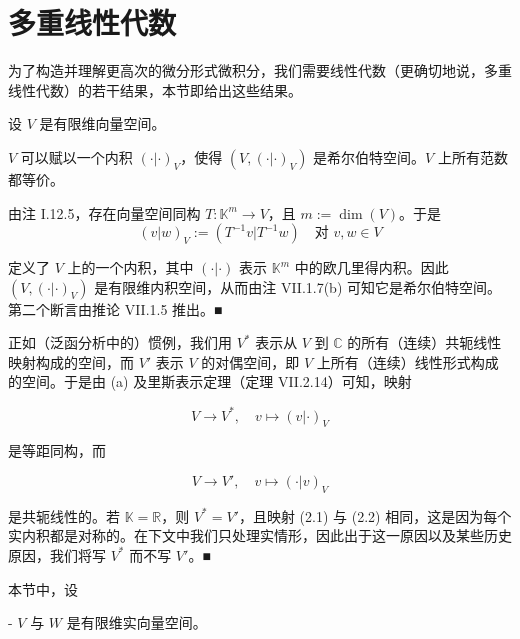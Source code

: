 \section{多重线性代数}

为了构造并理解更高次的微分形式微积分，我们需要线性代数（更确切地说，多重线性代数）的若干结果，本节即给出这些结果。

\begin{remark}

设 $ V $ 是有限维向量空间。

\begin{items}
\item

$ V $ 可以赋以一个内积 $ (\cdot|\cdot)_{V} $，使得 $ (V,(\cdot|\cdot)_{V}) $ 是希尔伯特空间。$ V $ 上所有范数都等价。

\proofhead
由注 I.12.5，存在向量空间同构 $ T:\mathbb{K}^{m} \to V $，且 $ m := \dim(V) $。于是
\[
(v|w)_{V} := (T^{-1}v|T^{-1}w) \quad \text{对 } v,w \in V
\]

定义了 $ V $ 上的一个内积，其中 $ (\cdot|\cdot) $ 表示 $ \mathbb{K}^{m} $ 中的欧几里得内积。因此 $ (V,(\cdot|\cdot)_{V}) $ 是有限维内积空间，从而由注 VII.1.7(b) 可知它是希尔伯特空间。第二个断言由推论 VII.1.5 推出。\nobreak\hspace{0.35em}■

\item

正如（泛函分析中的）惯例，我们用 $ V^{*} $ 表示从 $ V $ 到 $ \mathbb{C} $ 的所有（连续）共轭线性映射构成的空间，而 $ V' $ 表示 $ V $ 的对偶空间，即 $ V $ 上所有（连续）线性形式构成的空间。于是由 (a) 及里斯表示定理（定理 VII.2.14）可知，映射

\begin{equation}
V \to V^{*}, \quad v \mapsto (v|\cdot)_{V}\tag{2.1}
\end{equation}

是等距同构，而

\begin{equation}
V \to V', \quad v \mapsto (\cdot|v)_{V}\tag{2.2}
\end{equation}

是共轭线性的。若 $ \mathbb{K} = \mathbb{R} $，则 $ V^{*} = V' $，且映射 (2.1) 与 (2.2) 相同，这是因为每个实内积都是对称的。在下文中我们只处理实情形，因此出于这一原因以及某些历史原因，我们将写 $ V^{*} $ 而不写 $ V' $。\nobreak\hspace{0.35em}■

\end{items}

本节中，设

- $ V $ 与 $ W $ 是有限维实向量空间。

\end{remark}


